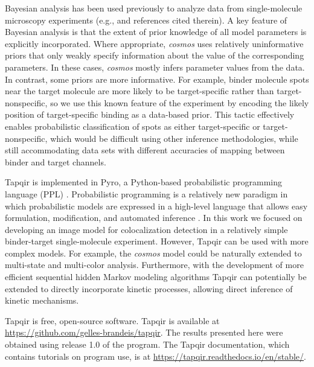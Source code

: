 Bayesian analysis has been used previously to analyze data from single-molecule microscopy experiments (e.g., \cite{Kinz-Thompson2021-tb} and references cited therein). A key feature of Bayesian analysis is that the extent of prior knowledge of all model parameters is explicitly incorporated. Where appropriate, \emph{cosmos} uses relatively uninformative priors that only weakly specify information about the value of the corresponding parameters.  In these cases, \emph{cosmos} mostly infers parameter values from the data.  In contrast, some priors are more informative.  For example, binder molecule spots near the target molecule are more likely to be target-specific rather than target-nonspecific, so we use this known feature of the experiment by encoding the likely position of target-specific binding as a data-based prior. This tactic effectively enables probabilistic classification of spots as either target-specific or target-nonspecific, which would be difficult using other inference methodologies, while still accommodating data sets with different accuracies of mapping between binder and target channels.

Tapqir is implemented in Pyro, a Python-based probabilistic programming language (PPL) \citep{Bingham2019-qy}. Probabilistic programming is a relatively new paradigm in which probabilistic models are expressed in a high-level language that allows easy formulation, modification, and automated inference \citep{Van_de_Meent2018-mi}. In this work we focused on developing an image model for colocalization detection in a relatively simple binder-target single-molecule experiment. However, Tapqir can be used with more complex models. For example, the \emph{cosmos} model could be naturally extended to multi-state and multi-color analysis. Furthermore, with the development of more efficient sequential hidden Markov modeling algorithms \citep{Sarkka2019-jw,Obermeyer2019-pp} Tapqir can potentially be extended to directly incorporate kinetic processes, allowing direct inference of kinetic mechanisms.

Tapqir is free, open-source software. Tapqir is available at \url{https://github.com/gelles-brandeis/tapqir}. The results presented here were obtained using release 1.0 of the program.  The Tapqir documentation, which contains tutorials on program use, is at \url{https://tapqir.readthedocs.io/en/stable/}.